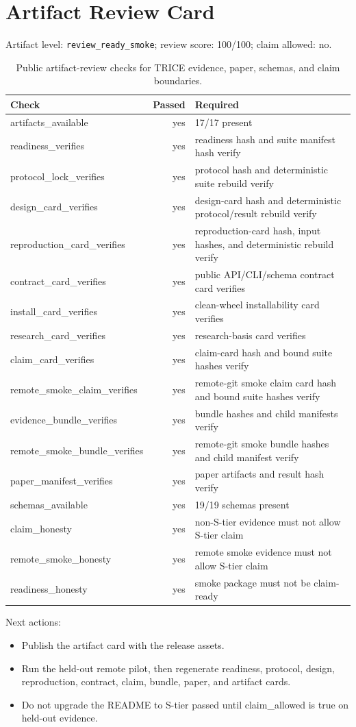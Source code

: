 \section{Artifact Review Card}
Artifact level: \texttt{review\_ready\_smoke}; review score: 100/100; claim allowed: no.

\begin{table}[h]
\centering
\begin{tabular}{lrl}
\toprule
Check & Passed & Required \\
\midrule
artifacts\_available & yes & 17/17 present \\
readiness\_verifies & yes & readiness hash and suite manifest hash verify \\
protocol\_lock\_verifies & yes & protocol hash and deterministic suite rebuild verify \\
design\_card\_verifies & yes & design-card hash and deterministic protocol/result rebuild verify \\
reproduction\_card\_verifies & yes & reproduction-card hash, input hashes, and deterministic rebuild verify \\
contract\_card\_verifies & yes & public API/CLI/schema contract card verifies \\
install\_card\_verifies & yes & clean-wheel installability card verifies \\
research\_card\_verifies & yes & research-basis card verifies \\
claim\_card\_verifies & yes & claim-card hash and bound suite hashes verify \\
remote\_smoke\_claim\_verifies & yes & remote-git smoke claim card hash and bound suite hashes verify \\
evidence\_bundle\_verifies & yes & bundle hashes and child manifests verify \\
remote\_smoke\_bundle\_verifies & yes & remote-git smoke bundle hashes and child manifest verify \\
paper\_manifest\_verifies & yes & paper artifacts and result hash verify \\
schemas\_available & yes & 19/19 schemas present \\
claim\_honesty & yes & non-S-tier evidence must not allow S-tier claim \\
remote\_smoke\_honesty & yes & remote smoke evidence must not allow S-tier claim \\
readiness\_honesty & yes & smoke package must not be claim-ready \\
\bottomrule
\end{tabular}
\caption{Public artifact-review checks for TRICE evidence, paper, schemas, and claim boundaries.}
\end{table}

\noindent Next actions:
\begin{itemize}
\item Publish the artifact card with the release assets.
\item Run the held-out remote pilot, then regenerate readiness, protocol, design, reproduction, contract, claim, bundle, paper, and artifact cards.
\item Do not upgrade the README to S-tier passed until claim\_allowed is true on held-out evidence.
\end{itemize}
